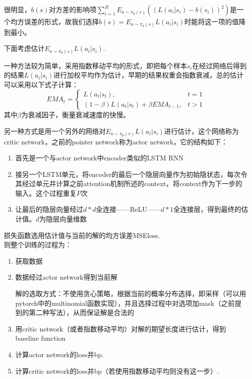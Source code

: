 \documentclass[a4paper]{article}
\begin{document}
很明显，$b\left(s\right)$对方差的影响项$\sum_{i=1}^BE_{a\sim \pi_\theta\left(s\right)}\left(\left(L\left(a_i|s_i\right)-b\left(s_i\right)\right)^2\right)$是一个均方误差的形式，故我们选择$b\left(s\right)=E_{a\sim \pi_\theta\left(s\right)}L\left(a_i|s_i\right)$时能将这一项的值降到最小。

下面考虑估计$ E_{a\sim \pi_\theta\left(s\right)}L\left(a_i|s_i\right)$.

一种方法较为简单，采用指数移动平均的形式，即把每个样本$s_i$在经过网络后得到的结果$L\left(a_i|s_i\right)$进行加权平均作为估计，早期的结果权重会指数衰减，总的估计可以采用以下式子计算：
$$EMA_t=
\begin{cases}
  L\left(a_t|s_t\right), & t=1 \\
  \left(1-\beta\right)L\left(a_t|s_t\right)+\beta EMA_{t-1}, & t>1
\end{cases}$$
其中$\beta$为衰减因子，衡量衰减速度的快慢。

另一种方式是用一个另外的网络对$ E_{a\sim \pi_\theta\left(s\right)}L\left(a_i|s_i\right)$进行估计，这个网络称为critic network，之前的pointer network称为actor network，它的结构如下：
\begin{enumerate}
\item 首先是一个与actor network中encoder类似的LSTM RNN
\item 接另一个LSTM单元，将encoder的最后一个隐层向量作为初始隐状态，每次令其经过单元并计算之前attention机制所述的context，将context作为下一步的输入。这个过程重复$P$次
\item 让最后的隐层向量经过$d*d$全连接——ReLU——$d*1$全连接层，得到最终的估计值。$d$为隐层向量维数
\end{enumerate}
损失函数选用估计值与当前的解的均方误差MSEloss.
\\

则整个训练的过程为：
\begin{enumerate}
\item 获取数据
\item 数据经过actor network得到当前解

  解的选取方式：不使用贪心策略，根据当前的概率分布选择，即采样（可以用pytorch中的multinomial函数实现），并且选择过程中对选项加mask（之前提到的第二种写法），从而保证解是合法的
\item 用critic network（或者指数移动平均）对解的期望长度进行估计，得到baseline function
\item 计算actor network的loss并bp.
\item 计算critic network的loss并bp（若使用指数移动平均则没有这一步）.
\end{enumerate}
\end{document}
